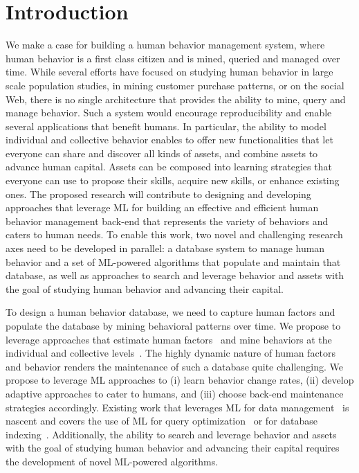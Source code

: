 \documentclass[11pt]{article}
\begin{document}
\section{Introduction}
We make a case for building a human behavior management system, where human behavior is a first class citizen and is mined, queried and managed over time. While several efforts have focused on studying human behavior in large scale population studies, in mining customer purchase patterns, or on the social Web, there is no single architecture that provides the ability to mine, query and manage behavior. Such a system would encourage reproducibility and enable several applications that benefit humans. In particular, the ability to model individual and collective behavior enables to offer new functionalities that let everyone can share and discover all kinds of assets, and combine assets to advance  human capital. Assets can be composed into learning strategies that everyone can use to propose their skills, acquire new skills, or enhance existing ones.  The proposed research will contribute to designing and developing approaches that leverage ML for building an effective and efficient human behavior management back-end that represents the variety of behaviors and caters to human needs. To enable this work, two novel and challenging research axes need to be developed in parallel: a database system to manage human behavior and a set of ML-powered algorithms that populate and maintain that database, as well as approaches to search and leverage behavior and assets with the goal of studying human behavior and advancing their capital.

To design a human behavior database, we need to capture human factors and populate the database by mining behavioral patterns over time. We propose to leverage approaches that estimate human factors~\cite{RTR+15} and mine behaviors at the individual and collective levels~\cite{DBLP:conf/vldb/KiferBG04, ijcai2017-336, miglausch2000thoughts}. The highly dynamic nature of human factors and behavior renders the maintenance of such a database quite challenging. We propose to leverage ML approaches to (i) learn behavior change rates, (ii) develop adaptive approaches to cater to humans, and (iii) choose back-end maintenance strategies accordingly.
Existing work that leverages ML for data management~\cite{DBLP:conf/sigmod/Stoica20} is nascent and covers the use of ML for query optimization~\cite{DBLP:conf/sigmod/KristoVCMK20} or for database indexing~\cite{DBLP:conf/sigmod/KraskaBCDP18}. Additionally, the ability to search and leverage behavior and assets with the goal of studying human behavior and advancing their capital requires the development of novel ML-powered algorithms. 
\end{document}
